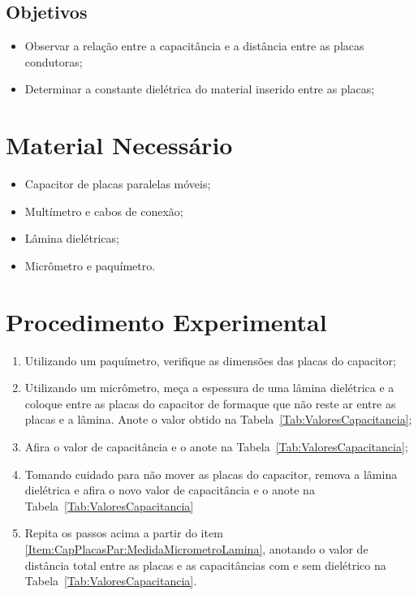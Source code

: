 \subsection{Objetivos}

\begin{itemize}
	\item Observar a relação entre a capacitância e a distância entre as placas condutoras;
	\item Determinar a constante dielétrica do material inserido entre as placas;
\end{itemize}

\section{Material Necessário}

\begin{itemize}
	\item Capacitor de placas paralelas móveis;
	\item Multímetro e cabos de conexão;
	\item Lâmina dielétricas;
	\item Micrômetro e paquímetro.
\end{itemize}

\section{Procedimento Experimental}

\begin{enumerate}
	\item Utilizando um paquímetro, verifique as dimensões das placas do capacitor;
	\item Utilizando um micrômetro, meça a espessura de uma lâmina dielétrica e a coloque entre as placas do capacitor de formaque que não reste ar entre as placas e a lâmina. Anote o valor obtido na Tabela~\ref{Tab:ValoresCapacitancia};\label{Item:CapPlacasPar:MedidaMicrometroLamina}
	\item Afira o valor de capacitância e o anote na Tabela~\ref{Tab:ValoresCapacitancia};
	\item Tomando cuidado para não mover as placas do capacitor, remova a lâmina dielétrica e afira o novo valor de capacitância e o anote na Tabela~\ref{Tab:ValoresCapacitancia}
	\item Repita os passos acima a partir do item \ref{Item:CapPlacasPar:MedidaMicrometroLamina}, anotando o valor de distância total entre as placas e as capacitâncias com e sem dielétrico na Tabela~\ref{Tab:ValoresCapacitancia}.
\end{enumerate}

